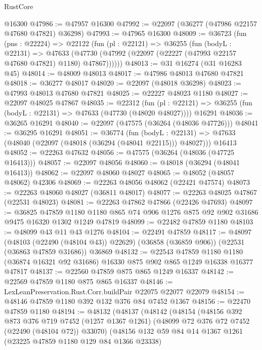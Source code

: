 \begin{lexlean}{RustCore}
\begin{coremodule}
    @16300
@47986 := @47957 @16300
@47992 := @22097 (@36277 (@47986 @22157 @47680 @47821) @36298)
@47993 := @47965 @16300
@48009 := @36723
    (fun (pns : @22224) =>
    @22122
      (fun (pl : @22121) =>
      @36255
        (fun (bodyL : @22131) =>
        @47633 (@47730 (@47992 (@22097 (@22227 (@47993 @22157 @47680 @47821) @1180) @47867))))))
@48013 := @31 @16274 (@31 @16283 @45)
@48014 := @48009 @48013
@48017 := @47986 @48013 @47680 @47821
@48018 := @36277 @48017
@48020 := @22097 (@48018 @36298)
@48023 := @47993 @48013 @47680 @47821
@48025 := @22227 @48023 @1180
@48027 := @22097 @48025 @47867
@48035 := @22312
    (fun (pl : @22121) => @36255 (fun (bodyL : @22131) => @47633 (@47730 (@48020 @48027))))
    @16291
@48036 := @36265 @16291
@48040 := @22097 (@47575 (@36264 (@48036 @47726)))
@48041 := @36295 @16291
@48051 := @36774
    (fun (bodyL : @22131) => @47633 (@48040 (@22097 (@48018 (@36294 (@48041 @22115))) @48027)))
    @16413
@48052 := @22263 @47632
@48056 := @47575 (@36264 (@48036 (@47725 @16413)))
@48057 := @22097 @48056
@48060 := @48018 (@36294 (@48041 @16413))
@48062 := @22097 @48060 @48027
@48065 := @48052 (@48057 @48062) @42306
@48069 := @22263 @48056 @48062 (@22421 @47574)
@48073 := @22263 @48060 @48027 (@36811 @48017)
@48077 := @22263 @48025 @47867 (@22531 @48023)
@48081 := @22263 @47862 @47866 (@22426 @47693)
@48097 := @36825
    @47859
    @1180
    @1180
    @865
    @74
    @906
    @1276
    @875
    @92
    @902
    @31686
    @9475
    @16320
    @1302
    @1249
    @47819
@48099 := @22482 @47859 @1180
@48103 := @48099 @43 @11 @43 @1276
@48104 := @22491 @47859
@48117 := @48097
    (@48103 (@22490 (@48104 @43)) @22629)
    (@36858 (@36859 @906))
    (@22531 (@36863 @47859 @31686))
    @36869
@48132 := @22543
    @47859
    @1180
    @1180
    (@36874 @16321 @92 @31686)
    @16330
    @875
    @902
    @865
    @1249
    @16338
    @16377
    @47817
@48137 := @22560 @47859 @875 @865 @1249 @16337
@48142 := @22569 @47859 @1180 @875 @865 @16337
@48146 := LexLeanPreservation.Rust.Corr.buildPair @22075 @22077 @22079
@48154 := @48146 @47859 @1180 @392 @132 @376 @84 @7452 @1367
@48156 := @22470 @47859 @1180
@48194 := @48132
    (@48137
      (@48142
        (@48154
          (@48156
            @392
            @873
            @376
            @719
            @7452
            (@1257 @1367 @1261)
            (@48099 @72 @376 @72 @7452 (@22490 (@48104 @72)) @33070)
            (@48156
              @132
              @59
              @84
              @14
              @1367
              @1261
              (@23225 @47859 @1180 @129 @84 @1366 @23338)

\end{coremodule}
\end{lexlean}
